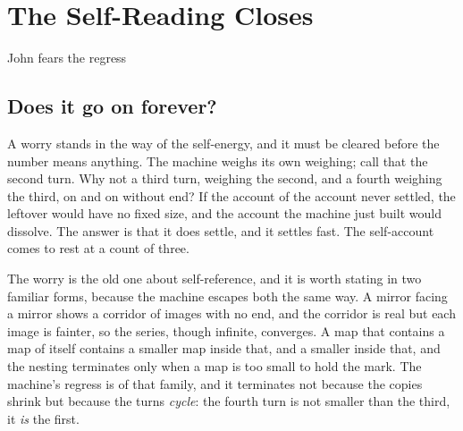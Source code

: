 \chapter{The Self-Reading Closes}

\begin{chorus}{John fears the regress}
\end{chorus}

\section{Does it go on forever?}

A worry stands in the way of the self-energy, and it must be cleared before the number means anything.
The machine weighs its own weighing; call that the second turn.
Why not a third turn, weighing the second, and a fourth weighing the third, on and on without end?
If the account of the account never settled, the leftover would have no fixed size, and the account the machine just built
would dissolve.
The answer is that it does settle, and it settles fast.
The self-account comes to rest at a count of three.

The worry is the old one about self-reference, and it is worth stating in two familiar forms, because the machine
escapes both the same way.
A mirror facing a mirror shows a corridor of images with no end, and the corridor is real but each image is fainter, so
the series, though infinite, converges.
A map that contains a map of itself contains a smaller map inside that, and a smaller inside that, and the nesting
terminates only when a map is too small to hold the mark.
The machine's regress is of that family, and it terminates not because the copies shrink but because the turns
\emph{cycle}: the fourth turn is not smaller than the third, it \emph{is} the first.

